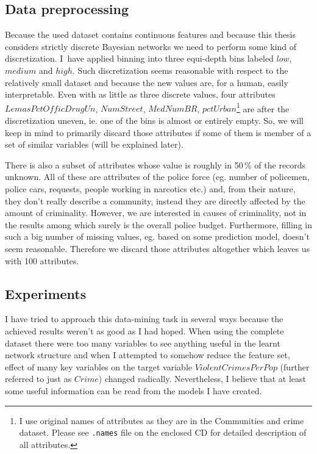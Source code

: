 \documentclass[english,cover]{fitthesis} %
\newcommand{\srccode}[1]{{\tt #1}}         %
\begin{document}
\subsection{Data preprocessing}
Because the used dataset contains continuous features and because this thesis considers strictly discrete Bayesian networks we need to perform some kind of discretization. I~have applied binning into three equi-depth bins labeled $low$, $medium$ and $high$. Such discretization seems reasonable with respect to the relatively small dataset and because the new values are, for a human, easily interpretable. Even with as little as three discrete values, four attributes $LemasPctOfficDrugUn$, $NumStreet$, $MedNumBR$, $pctUrban$\footnote{I use original names of attributes as they are in the Communities and crime dataset. Please see \srccode{.names} file on the enclosed CD for detailed description of all attributes.} are after the discretization uneven, ie. one of the bins is almost or entirely empty. So, we will keep in mind to primarily discard those attributes if some of them is member of a set of similar variables (will be explained later).

There is also a subset of attributes whose value is roughly in 50\,\% of the records unknown. All of these are attributes of the police force (eg. number of policemen, police cars, requests, people working in narcotics etc.) and, from their nature, they don't really describe a community, instead they are directly affected by the amount of criminality. However, we are interested in causes of criminality, not in the results among which surely is the overall police budget. Furthermore, filling in such a big number of missing values, eg. based on some prediction model, doesn't seem reasonable. Therefore we discard those attributes altogether which leaves us with 100 attributes.


\subsection{Experiments}

I have tried to approach this data-mining task in several ways because the achieved results weren't as good as I had hoped. When using the complete dataset there were too many variables to see anything useful in the learnt network structure and when I attempted to somehow reduce the feature set, effect of many key variables on the target variable $ViolentCrimesPerPop$ (further referred to just as $Crime$) changed radically. Nevertheless, I believe that at least some useful information can be read from the models I have created.
\end{document}
